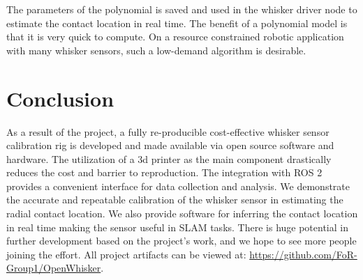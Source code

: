 \documentclass[runningheads]{llncs}
\begin{document}
The parameters of the polynomial is saved and used in the whisker driver node to estimate the contact location in real time. The benefit of a polynomial model is that it is very quick to compute. On a resource constrained robotic application with many whisker sensors, such a low-demand algorithm is desirable.

\section{Conclusion}

As a result of the project, a fully re-producible cost-effective whisker sensor calibration rig is developed and made available via open source software and hardware. The utilization of a 3d printer as the main component drastically reduces the cost and barrier to reproduction. The integration with ROS 2 provides a convenient interface for data collection and analysis. We demonstrate the accurate and repeatable calibration of the whisker sensor in estimating the radial contact location. We also provide software for inferring the contact location in real time making the sensor useful in SLAM tasks. There is huge potential in further development based on the project's work, and we hope to see more people joining the effort. All project artifacts can be viewed at: \url{https://github.com/FoR-Group1/OpenWhisker}.


\end{document}
